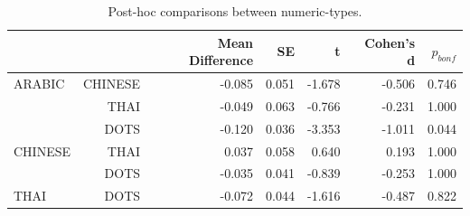 \begin{table}[!h]
	\centering
	\caption{Post-hoc comparisons between numeric-types.}
	\begin{tabular}{lrrrrrr}
		\hline
		 &  & Mean Difference & SE & t & Cohen's d & $p_{bonf}$  \\
		\hline
		ARABIC & CHINESE & -0.085 & 0.051 & -1.678 & -0.506 & 0.746  \\
		  & THAI & -0.049 & 0.063 & -0.766 & -0.231 & 1.000  \\
		 & DOTS & -0.120 & 0.036 & -3.353 & -1.011 & 0.044  \\
		CHINESE & THAI & 0.037 & 0.058 & 0.640 & 0.193 & 1.000  \\
		  & DOTS & -0.035 & 0.041 & -0.839 & -0.253 & 1.000  \\
		THAI & DOTS & -0.072 & 0.044 & -1.616 & -0.487 & 0.822  \\
		\hline\hline
	\end{tabular} 
	\label{tab:ttest_ContrastLang}
\end{table}


